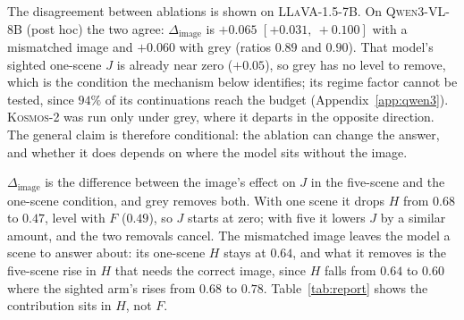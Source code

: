 \documentclass{article} %
\newcommand{\dSight}{\ensuremath{\Delta_{\mathrm{image}}}}
\newcommand{\civ}[2]{$[#1,\ #2]$}
\begin{document}
The disagreement between ablations is shown on \textsc{LLaVA-1.5-7B}. On
\textsc{Qwen3-VL-8B} (post hoc) the two agree: $\dSight$ is $+0.065$ \civ{+0.031}{+0.100} with a
mismatched image and $+0.060$ with grey (ratios $0.89$ and $0.90$). That model's sighted one-scene $J$
is already near zero ($+0.05$), so grey has no level to remove, which is the condition the mechanism
below identifies; its regime factor cannot be tested, since $94\%$ of its continuations reach the budget
(Appendix~\ref{app:qwen3}). \textsc{Kosmos-2} was run only under grey, where it departs in the opposite
direction. The general claim is therefore conditional: the ablation can change the answer, and whether
it does depends on where the model sits without the image.

$\dSight$ is the difference between the image's
effect on $J$ in the five-scene and the one-scene condition, and grey removes both. With one scene it
drops $H$ from $0.68$ to $0.47$, level with $F$ ($0.49$), so $J$ starts at zero; with five it lowers
$J$ by a similar amount, and the two removals cancel. The mismatched image leaves the model a scene
to answer about: its one-scene $H$ stays at $0.64$, and what it removes is the five-scene rise in $H$
that needs the correct image, since $H$ falls from $0.64$ to $0.60$ where the sighted arm's rises from
$0.68$ to $0.78$. Table~\ref{tab:report} shows the contribution sits in $H$, not $F$.
\end{document}
